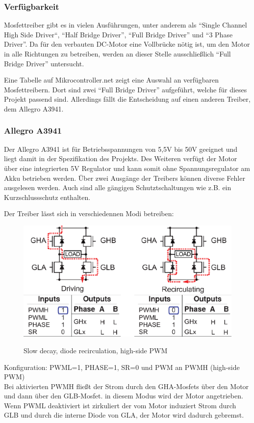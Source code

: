 \subsubsection{Verfügbarkeit}

Mosfettreiber gibt es in vielen Ausführungen, unter anderem als ``Single Channel High Side Driver``, ``Half Bridge Driver'', ``Full Bridge Driver''
und ``3 Phase Driver''. Da für den verbauten DC-Motor eine Vollbrücke nötig ist, um den Motor in alle Richtungen zu betreiben, werden an dieser Stelle
ausschließlich ``Full Bridge Driver'' untersucht.

Eine Tabelle auf Mikrocontroller.net\cite{FET_D_TABLE} zeigt eine Auswahl an verfügbaren Mosfettreibern. Dort sind zwei
``Full Bridge Driver'' aufgeführt, welche für dieses Projekt passend sind. Allerdings fällt die Entscheidung auf einen anderen Treiber,
dem Allegro A3941.
\subsubsection{Allegro A3941}
Der Allegro A3941 ist für Betriebsspannungen von 5,5V bis 50V geeignet und liegt damit in der Spezifikation des Projekts.
Des Weiteren verfügt der Motor über eine integrierten 5V Regulator und kann somit ohne Spannungsregulator am Akku betrieben werden.
Über zwei Ausgänge der Treibers können diverse Fehler ausgelesen werden. Auch sind alle gängigen Schutztschaltungen wie z.B. ein Kurzschlussschutz enthalten.


Der Treiber lässt sich in verschiedennen Modi betreiben:

\begin{figure}[H]
\centering
\includegraphics[width=.8\textwidth]{3941_1.png}\\
\caption{Slow decay, diode recirculation, high-side PWM \cite{ds-A3941}}%
\label{fig:39411}
\end{figure}

Konfiguration: PWML=1, PHASE=1, SR=0 und PWM an PWMH (high-side PWM)\\
Bei aktivierten PWMH fließt der Strom durch den GHA-Mosfets über den Motor und
dann über den GLB-Mosfet. in diesem Modus wird der Motor angetrieben.
Wenn PWML deaktiviert ist zirkuliert der vom Motor induziert Strom durch GLB und durch
die interne Diode von GLA, der Motor wird dadurch gebremst.


